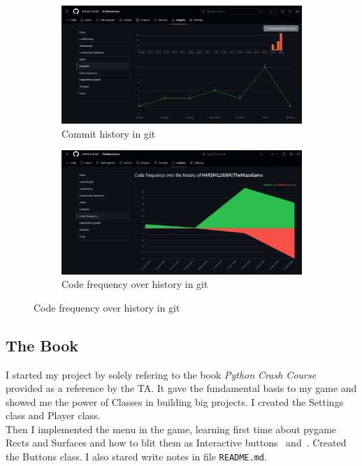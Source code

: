 \documentclass{article}
\begin{document}
\begin{figure}[h]
    \caption[1]{}
    \begin{subfigure}[b]{0.5\textwidth}
        \centering
        \includegraphics[width=\textwidth]{screenshots/commits.png}
        \caption[(a)]{Commit history in git}
        \label{fig:commit}
    \end{subfigure}
    \begin{subfigure}[b]{0.5\textwidth}
        \centering
        \includegraphics[width=\textwidth]{screenshots/code_freq.png}
        \caption[(a)]{Code frequency over history in git}
        \label{fig:code_freq}
    \end{subfigure}
\end{figure}

\subsection{The Book}
I started my project by solely refering to the book \textit{Python Crash Course}~\cite*{thebook} provided as a reference by the TA. It gave the fundamental basis to my game and showed me the power of Classes in building big projects. I created the Settings class and Player class.\\
Then I implemented the menu in the game, learning first time about pygame Rects and Surfaces and how to blit them as Interactive buttons~\cite{menu-geeksforgeeks} and~\cite{rendering_text}. Created the Buttons class. I also stared write notes in file \texttt{README.md}\cite{md-reference}.\\
\end{document}
